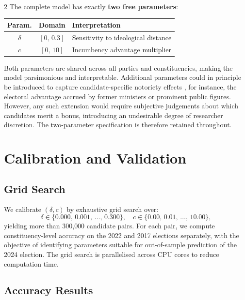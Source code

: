 \documentclass[10pt, a4paper]{article}
\begin{document}
\begin{multicols}{2}
The complete model has exactly \textbf{two free parameters}:

\begin{center}
\small
\begin{tabular}{ccp{3.2cm}}
\toprule
Param. & Domain & Interpretation \\
\midrule
$\delta$ & $[0,\,0.3]$ & Sensitivity to ideological distance \\
$c$      & $[0,\,10]$  & Incumbency advantage multiplier \\
\bottomrule
\end{tabular}
\end{center}

Both parameters are shared across all parties and constituencies, making the
model parsimonious and interpretable. Additional parameters could in principle
be introduced to capture candidate-specific notoriety effects , for
instance, the electoral advantage accrued by former ministers or prominent
public figures. However, any such extension would require subjective
judgements about which candidates merit a bonus, introducing an undesirable
degree of researcher discretion. The two-parameter specification is therefore
retained throughout.

\section{Calibration and Validation}
\label{sec:calibration}

\subsection{Grid Search}

We calibrate $(\delta, c)$ by exhaustive grid search over:
\[
  \delta \in \{0.000,\,0.001,\,\ldots,\,0.300\},\quad
  c \in \{0.00,\,0.01,\,\ldots,\,10.00\},
\]
yielding more than 300{,}000 candidate pairs.
For each pair, we compute constituency-level accuracy on the 2022 and 2017
elections separately, with the objective of identifying parameters suitable
for out-of-sample prediction of the 2024 election. The grid search is
parallelised across CPU cores to reduce computation time.

\subsection{Accuracy Results}


\end{multicols}
\end{document}
